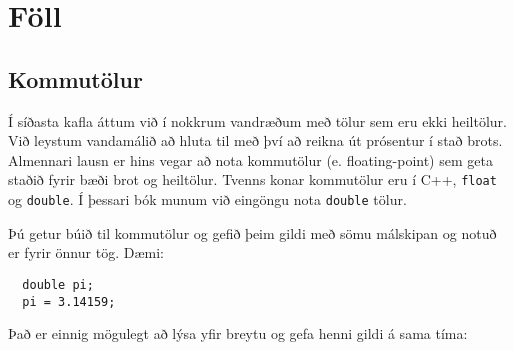 





\chapter{Föll}

\section{Kommutölur}

Í síðasta kafla áttum við í nokkrum vandræðum með tölur sem eru ekki heiltölur.
Við leystum vandamálið að hluta til með því að reikna út prósentur í stað brots.
Almennari lausn er hins vegar að nota kommutölur (e. floating-point) sem geta staðið fyrir bæði brot og heiltölur.
Tvenns konar kommutölur eru í C++, {\tt float} og {\tt double}.
Í þessari bók munum við eingöngu nota {\tt double} tölur.

Þú getur búið til kommutölur og gefið þeim gildi með sömu málskipan og notuð er fyrir önnur tög.
Dæmi:

\begin{verbatim}
  double pi;
  pi = 3.14159;
\end{verbatim}
%
Það er einnig mögulegt að lýsa yfir breytu og gefa henni gildi á sama tíma:

